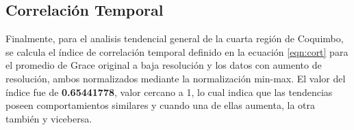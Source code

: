 \subsection{Correlación Temporal}
Finalmente, para el analisis tendencial general de la cuarta región de Coquimbo, se calcula el índice de correlación temporal definido en la ecuación \ref{eqn:cort}
para el promedio de Grace original a baja resolución y los datos con aumento de resolución, ambos normalizados mediante la normalización min-max. El valor del índice 
fue de \textbf{0.65441778}, valor cercano a 1, lo cual indica que las tendencias poseen comportamientos similares y cuando una de ellas aumenta, la otra también y vicebersa.

% 

%
%